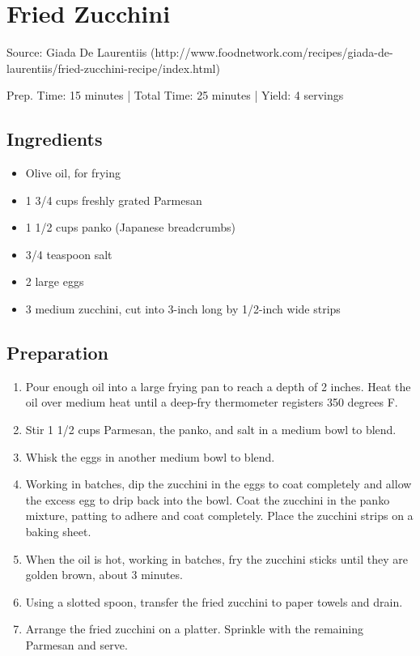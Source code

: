 \section{Fried Zucchini}

Source: Giada De Laurentiis (http://www.foodnetwork.com/recipes/giada-de-laurentiis/fried-zucchini-recipe/index.html)

\begin{center}
Prep. Time: 15 minutes |
Total Time: 25 minutes | 
Yield: 4 servings
\end{center}

\subsection{Ingredients}
\begin{itemize}
    \item Olive oil, for frying
    \item 1 3/4 cups freshly grated Parmesan
    \item 1 1/2 cups panko (Japanese breadcrumbs)
    \item 3/4 teaspoon salt
    \item 2 large eggs
    \item 3 medium zucchini, cut into 3-inch long by 1/2-inch wide strips
\end{itemize}

\subsection{Preparation}
\begin{enumerate}
    \item Pour enough oil into a large frying pan to reach a depth of 2 inches. Heat the oil over medium heat until a deep-fry thermometer registers 350 degrees F.
    \item Stir 1 1/2 cups Parmesan, the panko, and salt in a medium bowl to blend.
    \item Whisk the eggs in another medium bowl to blend. 
    \item Working in batches, dip the zucchini in the eggs to coat completely and allow the excess egg to drip back into the bowl. Coat the zucchini in the panko mixture, patting to adhere and coat completely. Place the zucchini strips on a baking sheet.
    \item When the oil is hot, working in batches, fry the zucchini sticks until they are golden brown, about 3 minutes.
    \item Using a slotted spoon, transfer the fried zucchini to paper towels and drain.
    \item Arrange the fried zucchini on a platter. Sprinkle with the remaining Parmesan and serve.
\end{enumerate}

